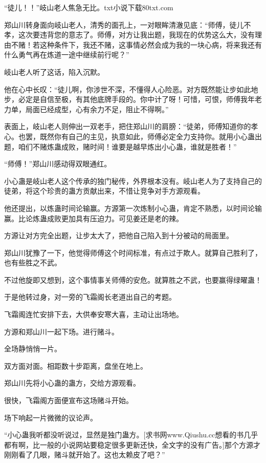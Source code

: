 
\begin{this_body}

“徒儿！！”岐山老人焦急无比。txt小说下载80txt.com

郑山川转身面向岐山老人，清秀的面孔上，一对眼眸清澈见底：“师傅，徒儿不孝，这次要违背您的意志了。师傅，对方让我出题，我现在的优势这么大，没有理由不赌！若这种条件下，我还不赌，这事情必然会成为我的一块心病，将来我还有什么勇气再在炼道一途中继续前行呢？”

岐山老人听了这话，陷入沉默。

他在心中长叹：“徒儿啊，你涉世不深，不懂得人心险恶。对方既然能让步如此地步，必定是自信至极，有其他底牌手段的。你中计了呀！可惜，可恨，师傅我年老力单，局面已经成型，心有余力不足，阻止不得啊。”

表面上，岐山老人则伸出一双老手，把住郑山川的肩膀：“徒弟，师傅知道你的孝心。也罢，既然你有自己的主见，执意如此，师傅必定全力支持你。就用小心蛊出题，咱们不赌炼蛊成败，赌时间！谁要是越早炼出小心蛊，谁就是胜者！”

“师傅！”郑山川感动得双眼通红。

小心蛊是岐山老人这个传承的独门秘传，外界根本没有。岐山老人为了支持自己的徒弟，将这个珍贵的蛊方贡献出来，不惜让竞争对手方源观看。

他还提出，以炼蛊时间论输赢。方源第一次炼制小心蛊，肯定不熟悉，以时间论输赢。比论炼蛊成败更加具有压迫力。可见姜还是老的辣。

方源让对方完全出题，让步太大了，把他自己陷入到十分被动的局面里。

郑山川犹豫了一下，他觉得师傅这个时间标准，有点过于欺人。就算自己胜利了，也有些胜之不武。

不过他旋即又想到，这个事情事关师傅的安危。就算胜之不武，也要赢得绿曜蛊！

于是他转过身，对一旁的飞霜阁长老道出自己的考题。

飞霜阁连忙安排下去，大供奉安寒大喜，主动让出场地。

方源和郑山川一起下场。进行赌斗。

全场静悄悄一片。

双方面对面。相距数十步距离，盘坐在地上。

郑山川先将小心蛊的蛊方，交给方源观看。

很快，飞霜阁方面便宣布这场赌斗开始。

场下响起一片微微的议论声。

“小心蛊我听都没听说过，显然是独门蛊方。[求书网www.Qiushu.cc想看的书几乎都有啊，比一般的小说网站要稳定很多更新还快，全文字的没有广告。]那个方源才刚刚看了几眼，赌斗就开始了。这也太赖皮了吧？”


\end{this_body}
